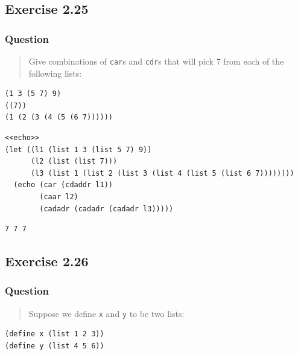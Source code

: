 \documentclass[final,fleqn,titlepage,twoside]{article}
\begin{document}
\subsection{Exercise 2.25}
\label{sec:org59d54d6}
\subsubsection{Question}
\label{sec:org9e29ca1}
\begin{quote}
Give combinations of \texttt{car}s and \texttt{cdr}s that will pick 7 from
each of the following lists:
\end{quote}

\begin{verbatim}
(1 3 (5 7) 9)
((7))
(1 (2 (3 (4 (5 (6 7))))))
\end{verbatim}

\begin{verbatim}
<<echo>>
(let ((l1 (list 1 3 (list 5 7) 9))
      (l2 (list (list 7)))
      (l3 (list 1 (list 2 (list 3 (list 4 (list 5 (list 6 7))))))))
  (echo (car (cdaddr l1))
        (caar l2)
        (cadadr (cadadr (cadadr l3)))))
\end{verbatim}

\begin{verbatim}
7 7 7 
\end{verbatim}

\subsection{Exercise 2.26}
\label{sec:orgc831dcc}
\subsubsection{Question}
\label{sec:org3be5c6a}
\begin{quote}
Suppose we define \texttt{x} and \texttt{y} to be two lists:
\end{quote}

\begin{verbatim}
(define x (list 1 2 3))
(define y (list 4 5 6))
\end{verbatim}
\end{document}

